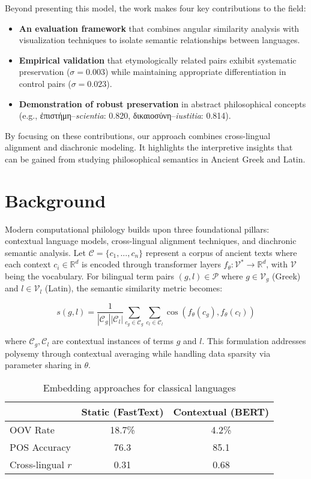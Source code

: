 \documentclass[11pt]{article} %
\begin{document}
Beyond presenting this model, the work makes four key contributions to the field:
\begin{itemize}
    \item \textbf{An evaluation framework} that combines angular similarity analysis with visualization techniques to isolate semantic relationships between languages.
    \item \textbf{Empirical validation} that etymologically related pairs exhibit systematic preservation ($\sigma = 0.003$) while maintaining appropriate differentiation in control pairs ($\sigma = 0.023$).
    \item \textbf{Demonstration of robust preservation} in abstract philosophical concepts (e.g., \textgreek{ἐπιστήμη}--\textit{scientia}: 0.820, \textgreek{δικαιοσύνη}--\textit{iustitia}: 0.814).
\end{itemize}

By focusing on these contributions, our approach combines cross-lingual alignment and diachronic modeling. It highlights the interpretive insights that can be gained from studying philosophical semantics in Ancient Greek and Latin.

\section{Background} 
Modern computational philology builds upon three foundational pillars: contextual language models, cross-lingual alignment techniques, and diachronic semantic analysis. Let $\mathcal{C} = \{c_1,...,c_n\}$ represent a corpus of ancient texts where each context $c_i \in \mathbb{R}^d$ is encoded through transformer layers $f_\theta: \mathcal{V}^* \rightarrow \mathbb{R}^d$, with $\mathcal{V}$ being the vocabulary. For bilingual term pairs $(g,l) \in \mathcal{P}$ where $g \in \mathcal{V}_g$ (Greek) and $l \in \mathcal{V}_l$ (Latin), the semantic similarity metric becomes:

\begin{equation}
s(g,l) = \frac{1}{|\mathcal{C}_g||\mathcal{C}_l|}\sum_{c_g \in \mathcal{C}_g}\sum_{c_l \in \mathcal{C}_l} \cos(f_\theta(c_g), f_\theta(c_l))
\end{equation}

where $\mathcal{C}_g, \mathcal{C}_l$ are contextual instances of terms $g$ and $l$. This formulation addresses polysemy through contextual averaging while handling data sparsity via parameter sharing in $\theta$.

\begin{table}[htbp]
\centering
\caption{Embedding approaches for classical languages}
\begin{tabular}{lcc}
 & Static (FastText) & Contextual (BERT) \\
\hline
OOV Rate & 18.7\% & 4.2\% \\
POS Accuracy & 76.3 & 85.1 \\
Cross-lingual $r$ & 0.31 & 0.68 \\
\end{tabular}
\end{table}
\end{document}
